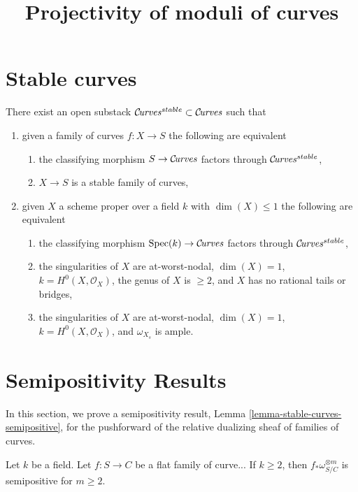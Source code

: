 


\title{Projectivity of moduli of curves}
\maketitle

\section{Stable curves}
\begin{lemma}
\label{lemma-stable-curves}
There exist an open substack $\mathcal{C}\!{\it urves}^{stable} \subset \mathcal{C}\!{\it urves}$
such that
\begin{enumerate}
\item given a family of curves $f : X \to S$ the following are equivalent
\begin{enumerate}
\item the classifying morphism $S \to \mathcal{C}\!{\it urves}$ factors
through $\mathcal{C}\!{\it urves}^{stable}$,
\item $X \to S$ is a stable family of curves,
\end{enumerate}
\item given $X$ a scheme proper over a field $k$ with
$\dim(X) \leq 1$ the following are equivalent
\begin{enumerate}
\item the classifying morphism $\mathop{\rm Spec}(k) \to \mathcal{C}\!{\it urves}$
factors through $\mathcal{C}\!{\it urves}^{stable}$,
\item the singularities of $X$ are at-worst-nodal, $\dim(X) = 1$,
$k = H^0(X, \mathcal{O}_X)$, the genus of $X$ is $\geq 2$, and
$X$ has no rational tails or bridges,
\item the singularities of $X$ are at-worst-nodal, $\dim(X) = 1$,
$k = H^0(X, \mathcal{O}_X)$, and $\omega_{X_s}$ is ample.
\end{enumerate}
\end{enumerate}
\end{lemma}

\section{Semipositivity Results}
In this section, we prove a semipositivity result,
Lemma \ref{lemma-stable-curves-semipositive}, for the pushforward of the
relative dualizing sheaf of families of curves.

\begin{lemma}
Let $k$ be a field.
Let $f : S \to C$ be a flat family of curve...
If $k \geq 2$, then $f_*\omega_{S/C}^{\otimes m}$ is semipositive for $m \geq 2$.
\end{lemma}

